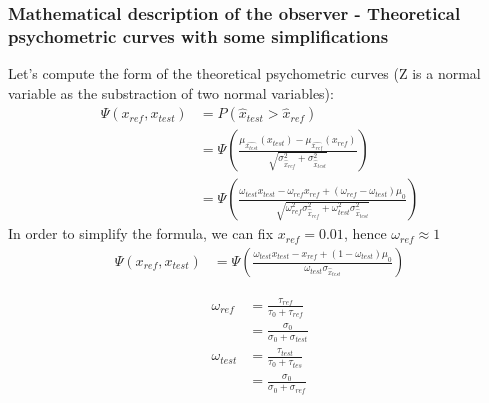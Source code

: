 \documentclass{article}
\begin{document}
\subsubsection*{Mathematical description of the observer - Theoretical psychometric curves with some simplifications }
Let's compute the form of the theoretical psychometric curves (Z is a normal variable as the substraction of two normal variables):\\
\begin{align*}
    \Psi(x_{ref},x_{test}) &= P(\hat{x}_{test} > \hat{x}_{ref})\\
    &= \Psi \left( \frac{\mu_{\hat{x_{test}}}(x_{test})-\mu_{\hat{x_{ref}}}(x_{ref})}{\sqrt{\sigma^2_{\hat{x}_{ref}}+\sigma^2_{\hat{x}_{test}}}} \right)\\
    &= \Psi \left( \frac{\omega_{test}x_{test}-\omega_{ref}x_{ref}+(\omega_{ref}-\omega_{test})\mu_0}{\sqrt{\omega_{ref}^2\sigma^2_{\hat{x}_{ref}}+\omega_{test}^2\sigma^2_{\hat{x}_{test}}}} \right)
\end{align*}
In order to simplify the formula, we can fix $x_{ref}=0.01$, hence $\omega_{ref} \approx 1$\\ 
\begin{align}
    \Psi(x_{ref},x_{test}) &= \Psi \left( \frac{\omega_{test}x_{test}-x_{ref}+(1-\omega_{test})\mu_0}{\omega_{test}\sigma_{\hat{x}_{test}}} \right)
\end{align}

\begin{align*}
    \omega_{ref} &= \frac{\tau_{ref}}{\tau_0+\tau_{ref}}\\
    &= \frac{\sigma_0}{\sigma_0+\sigma_{test}}\\
    \omega_{test}&= \frac{\tau_{test}}{\tau_0+\tau_{tes}}\\
    &= \frac{\sigma_0}{\sigma_0+\sigma_{ref}}\\
\end{align*}
\end{document}
